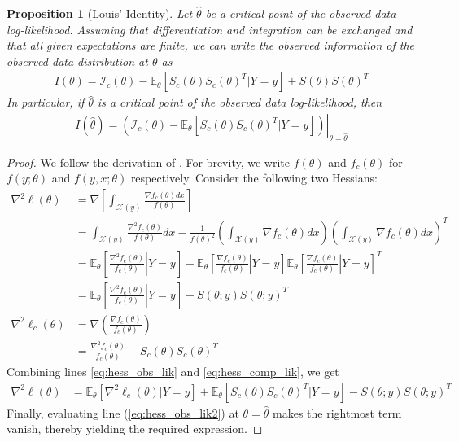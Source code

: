 \documentclass[ss]{imsart}
\theoremstyle{plain}
\newtheorem{proposition}{Proposition}[section]
\theoremstyle{definition}
\theoremstyle{remark}
\newcommand{\bE}{\mathbb{E}}
\begin{document}
\begin{proposition}[Louis' Identity]
    \label{thm2:info_decomp}
    Let $\hat{\theta}$ be a critical point of the observed data log-likelihood. Assuming that differentiation and integration can be exchanged and that all given expectations are finite, we can write the observed information of the observed data distribution at $\theta$ as
    \begin{align}
        I(\theta) = \mathcal{I}_c(\theta) - \bE_{\theta} [ S_c(\theta) S_c(\theta)^T | Y=y] + S(\theta) S(\theta)^T
    \end{align}
    In particular, if $\hat{\theta}$ is a critical point of the observed data log-likelihood, then
    \begin{align}
        I(\hat{\theta}) = \left. \left(\mathcal{I}_c(\theta)  -  \bE_{\theta} [ S_c(\theta) S_c(\theta)^T | Y=y]\right) \right|_{\theta = \hat{\theta}} \label{eq:info_at_MLE}
    \end{align}
\end{proposition}

\begin{proof}
    We follow the derivation of \citet{Lou82}. For brevity, we write $f(\theta)$ and $f_c(\theta)$ for $f(y; \theta)$ and $f(y, x; \theta)$ respectively. Consider the following two Hessians:
    \begin{align}
        \nabla^2 \ell(\theta) &= \nabla \left[ \int_{\mathcal{X}(y)} \frac{\nabla f_c(\theta) dx}{f(\theta)} \right]\\
        &= \int_{\mathcal{X}(y)} \frac{\nabla^2 f_c(\theta)}{f(\theta)} dx - \frac{1}{f(\theta)^2}\left( \int_{\mathcal{X}(y)} \nabla f_c(\theta) dx \right) \left( \int_{\mathcal{X}(y)} \nabla f_c(\theta) dx \right)^T\\
        &= \bE_\theta \left[ \left. \frac{\nabla^2 f_c(\theta)}{f_c(\theta)} \right| Y=y \right] - \bE_\theta \left[ \left. \frac{\nabla f_c(\theta)}{f_c(\theta)} \right| Y=y \right] \bE_\theta \left[ \left. \frac{\nabla f_c(\theta)}{f_c(\theta)} \right| Y=y \right]^T\\
        &= \bE_\theta \left[ \left. \frac{\nabla^2 f_c(\theta)}{f_c(\theta)} \right| Y=y \right] - S(\theta; y) S(\theta; y)^T \label{eq:hess_obs_lik}\\
        \nabla^2 \ell_c(\theta) &= \nabla \left( \frac{\nabla f_c(\theta)}{f_c(\theta)} \right)\\
        &= \frac{\nabla^2 f_c(\theta)}{f_c(\theta)} - S_c(\theta) S_c(\theta)^T \label{eq:hess_comp_lik}
    \end{align}
    Combining lines \ref{eq:hess_obs_lik} and \ref{eq:hess_comp_lik}, we get
    \begin{align}
        \nabla^2 \ell(\theta) &= \bE_\theta [ \nabla^2 \ell_c(\theta) | Y=y] + \bE_\theta [ S_c(\theta) S_c(\theta)^T | Y=y] - S(\theta; y) S(\theta; y)^T \label{eq:hess_obs_lik2}
    \end{align}
    Finally, evaluating line (\ref{eq:hess_obs_lik2}) at $\theta = \hat{\theta}$ makes the rightmost term vanish, thereby yielding the required expression.
\end{proof}
\end{document}
